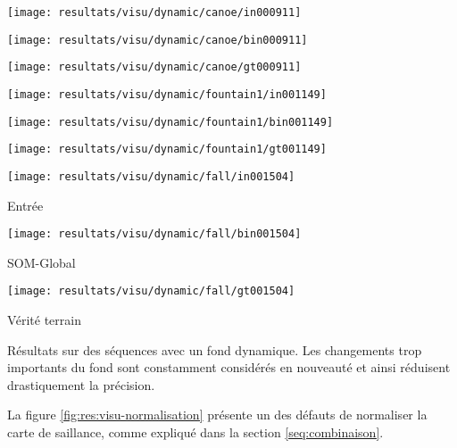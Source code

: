 	\begin{figureth}
		\begin{subfigureth}{.32\textwidth}
			\texttt{[image: resultats/visu/dynamic/canoe/in000911]}
		\end{subfigureth}
		\begin{subfigureth}{.32\textwidth}
			\texttt{[image: resultats/visu/dynamic/canoe/bin000911]}
		\end{subfigureth}
		\begin{subfigureth}{.32\textwidth}
			\texttt{[image: resultats/visu/dynamic/canoe/gt000911]}
		\end{subfigureth}

		\begin{subfigureth}{.32\textwidth}
			\texttt{[image: resultats/visu/dynamic/fountain1/in001149]}
		\end{subfigureth}
		\begin{subfigureth}{.32\textwidth}
			\texttt{[image: resultats/visu/dynamic/fountain1/bin001149]} 
		\end{subfigureth}
		\begin{subfigureth}{.32\textwidth}
			\texttt{[image: resultats/visu/dynamic/fountain1/gt001149]} 
		\end{subfigureth}

		\begin{subfigureth}{.32\textwidth}
			\texttt{[image: resultats/visu/dynamic/fall/in001504]} \caption{Entrée}
		\end{subfigureth}
		\begin{subfigureth}{.32\textwidth}
			\texttt{[image: resultats/visu/dynamic/fall/bin001504]} \caption{SOM-Global}
		\end{subfigureth}
		\begin{subfigureth}{.32\textwidth}
			\texttt{[image: resultats/visu/dynamic/fall/gt001504]} \caption{Vérité terrain}
		\end{subfigureth}
		\caption[Visualisation résultats dynamiques]{Résultats sur des séquences avec un fond dynamique. Les changements trop importants du fond sont constamment considérés en nouveauté et ainsi réduisent drastiquement la précision.}\label{fig:res:visu-dynamic}
	\end{figureth}

	La figure \ref{fig:res:visu-normalisation} présente un des défauts de normaliser la carte de saillance, comme expliqué dans la section \ref{seq:combinaison}.

